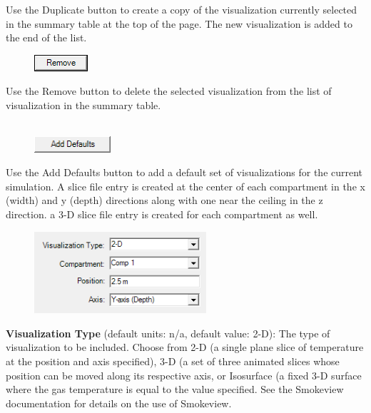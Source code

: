 Use the Duplicate button to create a copy of the visualization currently selected in the summary table at the top of the page. The new visualization is added to the end of the list. \\

\begin{figure}
  \includegraphics[width=0.781in]{FIGURES/Input_File/Remove_Button}
\end{figure}

Use the Remove button to delete the selected visualization from the list of visualization in the summary table. \\~ \\

\begin{figure}
  \includegraphics[width=1.11in]{FIGURES/Input_File/Add_Defaults_Button}
\end{figure}

Use the Add Defaults button to add a default set of visualizations for the current simulation. A slice file entry is created at the center of each compartment in the x (width) and y (depth) directions along with one near the ceiling in the z direction. a 3-D slice file entry is created for each compartment as well. \\

\begin{figure}
  \includegraphics[width=2.511in]{FIGURES/Input_File/Visualizations_Type}
\end{figure}

\textbf{Visualization Type} (default units: n/a, default value: 2-D): The type of visualization to be included. Choose from 2-D (a single plane slice of temperature at the position and axis specified), 3-D (a set of three animated slices whose position can be moved along its respective axis, or Isosurface (a fixed 3-D surface where the gas temperature is equal to the value specified. See the Smokeview documentation \cite{Smokeview_Users_Guide_6}for details on the use of Smokeview.

